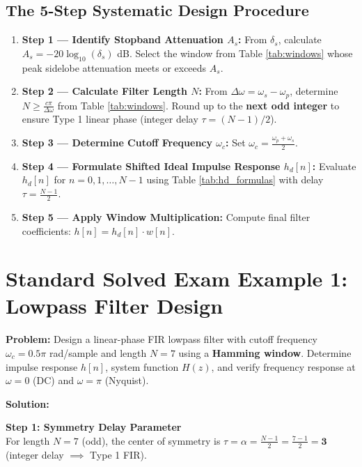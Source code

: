 \documentclass[11pt,a4paper]{article}
\begin{document}
\subsection{The 5-Step Systematic Design Procedure}
\begin{enumerate}
    \item \textbf{Step 1 — Identify Stopband Attenuation $A_s$:} From $\delta_s$, calculate $A_s = -20\log_{10}(\delta_s)$ dB. Select the window from Table \ref{tab:windows} whose peak sidelobe attenuation meets or exceeds $A_s$.
    \item \textbf{Step 2 — Calculate Filter Length $N$:} From $\Delta\omega = \omega_s - \omega_p$, determine $N \ge \frac{c\pi}{\Delta\omega}$ from Table \ref{tab:windows}. Round up to the \textbf{next odd integer} to ensure Type 1 linear phase (integer delay $\tau = (N-1)/2$).
    \item \textbf{Step 3 — Determine Cutoff Frequency $\omega_c$:} Set $\omega_c = \frac{\omega_p + \omega_s}{2}$.
    \item \textbf{Step 4 — Formulate Shifted Ideal Impulse Response $h_d[n]$:} Evaluate $h_d[n]$ for $n = 0, 1, \dots, N-1$ using Table \ref{tab:hd_formulas} with delay $\tau = \frac{N-1}{2}$.
    \item \textbf{Step 5 — Apply Window Multiplication:} Compute final filter coefficients: $h[n] = h_d[n] \cdot w[n]$.
\end{enumerate}

\newpage

\section{Standard Solved Exam Example 1: Lowpass Filter Design}

\textbf{Problem:} Design a linear-phase FIR lowpass filter with cutoff frequency $\omega_c = 0.5\pi$ rad/sample and length $N = 7$ using a \textbf{Hamming window}. Determine impulse response $h[n]$, system function $H(z)$, and verify frequency response at $\omega = 0$ (DC) and $\omega = \pi$ (Nyquist).

\vspace{1mm}
\noindent\textbf{Solution:}

\noindent\textbf{Step 1: Symmetry Delay Parameter} \\
For length $N = 7$ (odd), the center of symmetry is $\tau = \alpha = \frac{N - 1}{2} = \frac{7 - 1}{2} = \mathbf{3}$ (integer delay $\implies$ Type 1 FIR).
\end{document}
